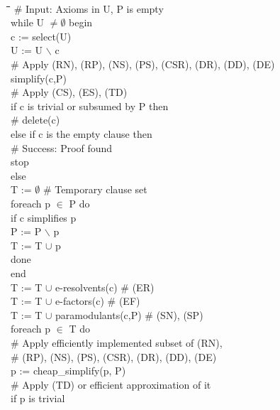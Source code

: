 \documentclass{article}
\begin{document}
\begin{figure}[hp]
  \begin{center}
    \tt
    \begin{tabbing}
      \quad\quad \= \quad\quad \= \quad\quad \=  \quad\quad \= \quad\quad \= \kill
      \# Input: Axioms in U, P is empty\\
      while U $\not= \emptyset{}$ begin\+\\
        c := select(U)\\
        U := U $\backslash$ c\\

        \# Apply (RN), (RP), (NS), (PS), (CSR), (DR), (DD), (DE)\\
        simplify(c,P)\\
        \# Apply (CS), (ES), (TD)\\
        if c is trivial or subsumed by P then\+\\
          \# delete(c)\-\\
        else if c is the empty clause then\+\\
          \# Success: Proof found\\
          stop\-\\
        else\+\\
          T := $\emptyset{}$ \# Temporary clause set\\
          foreach p $\in$ P do\+\\
            if c simplifies p \+\\
              P := P $\backslash$ p\\
              T := T $\cup$ p\-\\
            done\\
          end\\
          T := T $\cup$ e-resolvents(c)    \# (ER)\\
          T := T $\cup$ e-factors(c)       \# (EF)\\
          T := T $\cup$ paramodulants(c,P) \# (SN), (SP)\\
          foreach p $\in$ T do\+\\
            \# Apply efficiently implemented subset of (RN),\\
            \# (RP), (NS), (PS), (CSR), (DR), (DD), (DE)\\
            p := cheap\_simplify(p, P)\\
            \# Apply (TD) or efficient approximation of it\\
            if p is trivial\+\\

\end{tabbing}
\end{center}
\end{figure}
\end{document}
